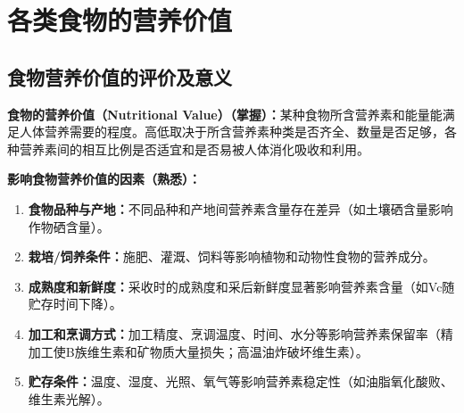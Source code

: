 \chapter{各类食物的营养价值}
\setcounter{chapter}{3}

\section{食物营养价值的评价及意义}

\begin{keybox}
\textbf{食物的营养价值（Nutritional Value）（掌握）：}某种食物所含营养素和能量能满足人体营养需要的程度。高低取决于所含营养素种类是否齐全、数量是否足够，各种营养素间的相互比例是否适宜和是否易被人体消化吸收和利用。
\end{keybox}

\begin{defbox}
\textbf{影响食物营养价值的因素（熟悉）：}
\begin{enumerate}[leftmargin=*]
    \item \textbf{食物品种与产地：}不同品种和产地间营养素含量存在差异（如土壤硒含量影响作物硒含量）。
    \item \textbf{栽培/饲养条件：}施肥、灌溉、饲料等影响植物和动物性食物的营养成分。
    \item \textbf{成熟度和新鲜度：}采收时的成熟度和采后新鲜度显著影响营养素含量（如Vc随贮存时间下降）。
    \item \textbf{加工和烹调方式：}加工精度、烹调温度、时间、水分等影响营养素保留率（精加工使B族维生素和矿物质大量损失；高温油炸破坏维生素）。
    \item \textbf{贮存条件：}温度、湿度、光照、氧气等影响营养素稳定性（如油脂氧化酸败、维生素光解）。
\end{enumerate}
\end{defbox}


